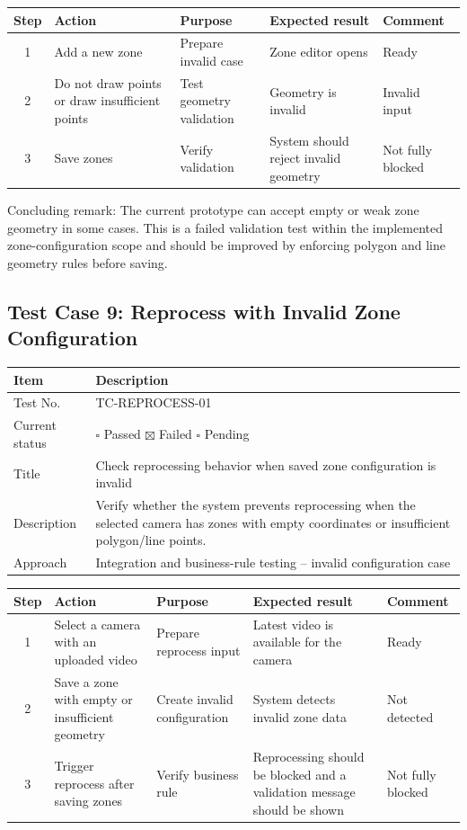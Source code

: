 \documentclass[12pt,a4paper]{report}
\begin{document}
\begin{longtable}{|c|p{3.6cm}|p{3.6cm}|p{3.6cm}|p{2cm}|}
\hline
\rowcolor{HeaderBlue}
\textbf{Step} & \textbf{Action} & \textbf{Purpose} & \textbf{Expected result} & \textbf{Comment} \\
\hline
1 & Add a new zone & Prepare invalid case & Zone editor opens & Ready \\
\hline
2 & Do not draw points or draw insufficient points & Test geometry validation & Geometry is invalid & Invalid input \\
\hline
3 & Save zones & Verify validation & System should reject invalid geometry & Not fully blocked \\
\hline
\end{longtable}

Concluding remark: The current prototype can accept empty or weak zone geometry in some cases. This is a failed validation test within the implemented zone-configuration scope and should be improved by enforcing polygon and line geometry rules before saving.

\subsection{Test Case 9: Reprocess with Invalid Zone Configuration}
\begin{longtable}{|p{4cm}|p{10cm}|}
\hline
\rowcolor{HeaderBlue}\textbf{Item} & \textbf{Description} \\
\hline
Test No. & TC-REPROCESS-01 \\
\hline
Current status & $\square$ Passed \quad $\boxtimes$ Failed \quad $\square$ Pending \\
\hline
Title & Check reprocessing behavior when saved zone configuration is invalid \\
\hline
Description & Verify whether the system prevents reprocessing when the selected camera has zones with empty coordinates or insufficient polygon/line points. \\
\hline
Approach & Integration and business-rule testing -- invalid configuration case \\
\hline
\end{longtable}

\begin{longtable}{|c|p{3.6cm}|p{3.6cm}|p{3.6cm}|p{2cm}|}
\hline
\rowcolor{HeaderBlue}
\textbf{Step} & \textbf{Action} & \textbf{Purpose} & \textbf{Expected result} & \textbf{Comment} \\
\hline
1 & Select a camera with an uploaded video & Prepare reprocess input & Latest video is available for the camera & Ready \\
\hline
2 & Save a zone with empty or insufficient geometry & Create invalid configuration & System detects invalid zone data & Not detected \\
\hline
3 & Trigger reprocess after saving zones & Verify business rule & Reprocessing should be blocked and a validation message should be shown & Not fully blocked \\
\hline
\end{longtable}
\end{document}
